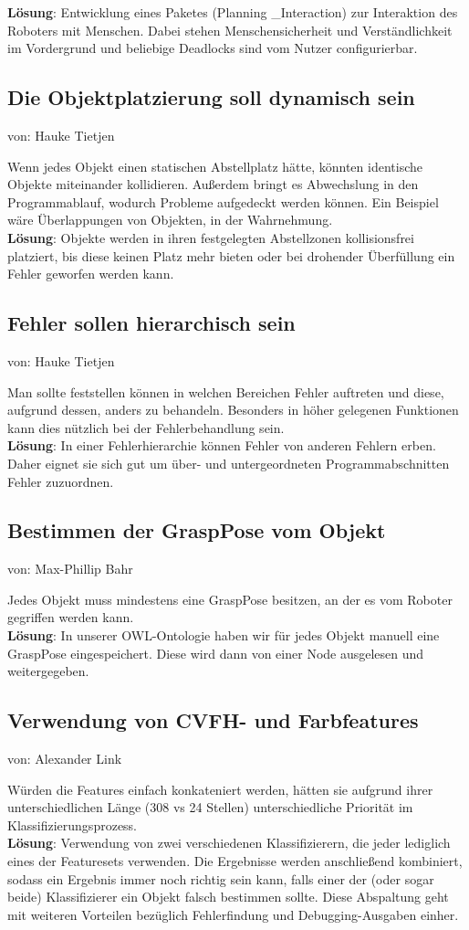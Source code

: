 \documentclass{suturo}
\makeatletter
\newcommand{\chapterauthor}[1]{%
  {\parindent0pt\vspace*{-27pt}%
  \linespread{0}\small\begin{flushright}von: #1\end{flushright}%
  \par\nobreak\vspace*{0pt}}
  \@afterheading%
}
\makeatother
\begin{document}
\textbf{Lösung}: Entwicklung eines Paketes (Planning \_Interaction) zur Interaktion des Roboters mit Menschen. Dabei stehen Menschensicherheit und Verständlichkeit im Vordergrund und beliebige Deadlocks sind vom Nutzer configurierbar.


\subsection{Die Objektplatzierung soll dynamisch sein}
\chapterauthor{Hauke Tietjen}
Wenn jedes Objekt einen statischen Abstellplatz hätte, könnten identische Objekte miteinander kollidieren. Außerdem bringt es Abwechslung in den Programmablauf, wodurch Probleme aufgedeckt werden können. Ein Beispiel wäre Überlappungen von Objekten, in der Wahrnehmung.\\

\textbf{Lösung}: Objekte werden in ihren festgelegten Abstellzonen kollisionsfrei platziert, bis diese keinen Platz mehr bieten oder bei drohender Überfüllung ein Fehler geworfen werden kann.


\subsection{Fehler sollen hierarchisch sein}
\chapterauthor{Hauke Tietjen}
Man sollte feststellen können in welchen Bereichen Fehler auftreten und diese, aufgrund dessen, anders zu behandeln. Besonders in höher gelegenen Funktionen kann dies nützlich bei der Fehlerbehandlung sein.\\

\textbf{Lösung}: In einer Fehlerhierarchie können Fehler von anderen Fehlern erben. Daher eignet sie sich gut um über- und untergeordneten Programmabschnitten Fehler zuzuordnen.

\subsection{Bestimmen der GraspPose vom Objekt}
\chapterauthor{Max-Phillip Bahr}
Jedes Objekt muss mindestens eine GraspPose besitzen, an der es vom Roboter gegriffen werden kann.\\

\textbf{Lösung}: In unserer OWL-Ontologie haben wir für jedes Objekt manuell eine GraspPose eingespeichert. Diese wird dann von einer Node ausgelesen und weitergegeben.

\subsection{Verwendung von CVFH- und Farbfeatures}
\chapterauthor{Alexander Link}
Würden die Features einfach konkateniert werden, hätten sie aufgrund ihrer unterschiedlichen Länge (308 vs 24 Stellen) unterschiedliche Priorität im Klassifizierungsprozess. \\
\textbf{Lösung}: Verwendung von zwei verschiedenen Klassifizierern, die jeder lediglich eines der Featuresets verwenden. Die Ergebnisse werden anschließend kombiniert, sodass ein Ergebnis immer noch richtig sein kann, falls einer der (oder sogar beide) Klassifizierer ein Objekt falsch bestimmen sollte. Diese Abspaltung geht mit weiteren Vorteilen bezüglich Fehlerfindung und Debugging-Ausgaben einher.
\end{document}
